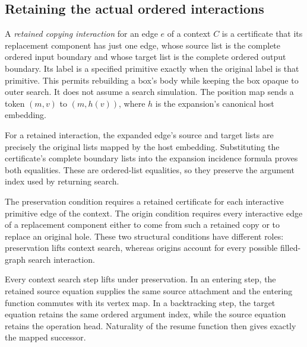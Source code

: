 \subsection{Retaining the actual ordered interactions}

A \emph{retained copying interaction} for an edge $e$ of a context $C$ is a
certificate that its replacement component has just one edge, whose source
list is the complete ordered input boundary and whose target list is the
complete ordered output boundary. Its label is a specified primitive exactly
when the original label is that primitive. This permits rebuilding a box's
body while keeping the box opaque to outer search. It does not assume a
search simulation. The position map sends a token $(m,v)$ to $(m,h(v))$, where
$h$ is the expansion's canonical host embedding.



For a retained interaction, the expanded edge's source and target lists
are precisely the original lists mapped by the host embedding. Substituting
the certificate's complete boundary lists into the expansion incidence
formula proves both equalities. These are ordered-list equalities, so they
preserve the argument index used by returning search.



The preservation condition requires a retained certificate for each
interactive primitive edge of the context. The origin condition requires
every interactive edge of a replacement component either to come from such
a retained copy or to replace an original hole. These two structural
conditions have different roles: preservation lifts context search, whereas
origins account for every possible filled-graph search interaction.



Every context search step lifts under preservation. In an entering step,
the retained source equation supplies the same source attachment and the
entering function commutes with its vertex map. In a backtracking step, the
target equation retains the same ordered argument index, while the source
equation retains the operation head. Naturality of the resume function then
gives exactly the mapped successor.

